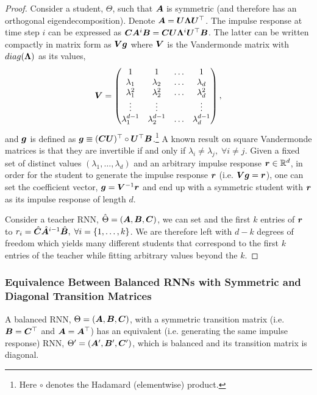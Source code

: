 \begin{proof}
    Consider a student, $\Theta$, such that ${\bm{A}}$ is symmetric (and therefore has an orthogonal eigendecomposition). Denote ${\bm{A}}={\bm{U}}{\bm{\Lambda}} {\bm{U}}^\top$. The impulse response at time step $i$ can be expressed as ${\bm{C}}{\bm{A}}^i{\bm{B}}={\bm{C}}{\bm{U}}{\bm{\Lambda}}^i {\bm{U}}^\top {\bm{B}}$. The latter can be written compactly in matrix form as ${\bm{V}}{\bm{g}}$ where ${\bm{V}}$ is the Vandermonde matrix with $diag({\bm{\Lambda}})$ as its values,
    \begin{equation*}
        {\bm{V}}=\begin{pmatrix}
            1 & 1 & \dots & 1\\
            \lambda_1 & \lambda_2 & \dots & \lambda_d\\
            \lambda_1^2 & \lambda_2^2 & \dots & \lambda_d^2\\
            \vdots & \vdots & & \vdots \\
            \lambda_1^{d-1} & \lambda_2^{d-1} & \dots & \lambda_d^{d-1}\\
        \end{pmatrix},
    \end{equation*}
    and ${\bm{g}}$ is defined as ${\bm{g}}\equiv ({\bm{C}}{\bm{U}})^\top\circ {\bm{U}}^\top {\bm{B}}$.\footnote{Here $\circ$ denotes the Hadamard (elementwise) product.} A known result on square Vandermonde matrices is that they are invertible if and only if $\lambda_i\neq \lambda_j,\; \forall i\neq j$. Given a fixed set of distinct values $(\lambda_1,\dots,\lambda_d)$ and an arbitrary impulse response ${\bm{r}}\in\mathbb{R}^d$, in order for the student to generate the impulse response ${\bm{r}}$ (i.e. ${\bm{V}}{\bm{g}}={\bm{r}}$), one can set the coefficient vector, ${\bm{g}}={\bm{V}}^{-1}{\bm{r}}$ and end up with a symmetric student with ${\bm{r}}$ as its impulse response of length $d$.
    
    Consider a teacher RNN, $\hat{\Theta}=\left({\bm{A}},{\bm{B}},{\bm{C}}\right)$, we can set and the first $k$ entries of ${\bm{r}}$ to $ {r}_i=\hat{{\bm{C}}}\hat{{\bm{A}}}^{i-1}\hat{{\bm{B}}},\; \forall i=\{1,\dots,k\}$. We are therefore left with $d-k$ degrees of freedom which yields many different students that correspond to the first $k$ entries of the teacher while fitting arbitrary values beyond the $k$.
\end{proof}

\subsubsection{Equivalence Between Balanced RNNs with Symmetric and Diagonal Transition Matrices}
\begin{lemma}\label{lemma:equiv_diagonal_rnn}
A balanced RNN, $\Theta=({\bm{A}},{\bm{B}},{\bm{C}})$, with a symmetric transition matrix (i.e. ${\bm{B}}={\bm{C}}^\top$ and ${\bm{A}}={\bm{A}}^\top$) has an equivalent (i.e. generating the same impulse response) RNN, $\Theta'=({\bm{A}}',{\bm{B}}',{\bm{C}}')$, which is balanced and its transition matrix is diagonal.
\end{lemma}

